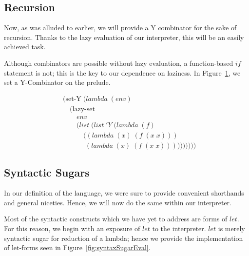 \subsection{Recursion}
Now, as was alluded to earlier, we will provide a Y combinator for the 
sake of recursion. Thanks to the lazy evaluation of our interpreter, this 
will be an easily achieved task.

Although combinators are possible without lazy evaluation, a function-based 
$if$ statement is not; this is the key to our dependence on laziness. In 
Figure~\ref{fig:preludeY}, we set a Y-Combinator on the prelude.

\begin{figure}[htp]
\caption{}\label{fig:preludeY}
\begin{align*}
& (\text{set-Y} \; (lambda \; (env)
\\& \quad (\text{lazy-set}
\\& \qquad env
\\& \qquad (list \; (list \; 'Y \; (lambda \; (f) \; 
\\& \qquad \quad ((lambda \; (x) \; (f \; (x \; x))) \; 
\\& \qquad \quad \; (lambda \; (x) \; (f \; (x \; x))))))))))
\end{align*}
\end{figure}

\subsection{Syntactic Sugars}
In our definition of the language, we were sure to provide convenient 
shorthands and general niceties. Hence, we will now do the same within our 
interpreter.

Most of the syntactic constructs which we have yet to address are forms of 
$let$. For this reason, we begin with an exposure of $let$ to the 
interpreter. $let$ is merely syntactic sugar for reduction of a lambda; hence 
we provide the implementation of let-forms seen in Figure~\ref{fig:syntaxSugarEval}.


